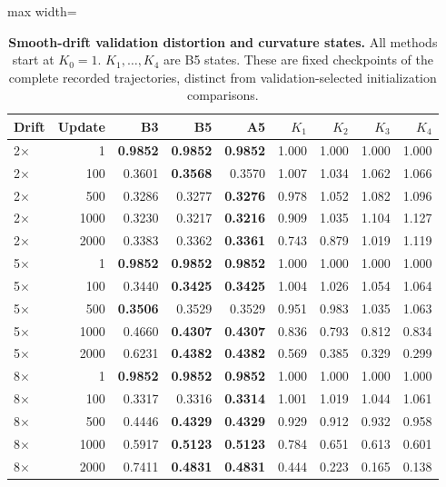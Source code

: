 \begin{table}[H]
\centering
\caption{\textbf{Smooth-drift validation distortion and curvature states.} All methods start at $K_0=1$. $K_1,\ldots,K_4$ are B5 states. These are fixed checkpoints of the complete recorded trajectories, distinct from validation-selected initialization comparisons.}
\label{tab:drift-states}
\footnotesize\setlength{\tabcolsep}{4.2pt}\renewcommand{\arraystretch}{1.12}
\begin{adjustbox}{max width=\linewidth}
\begin{tabular}{lrrrrrrrr}
\toprule
Drift & Update & B3 & B5 & A5 & $K_1$ & $K_2$ & $K_3$ & $K_4$ \\
\midrule
2$\times$ & 1 & \textbf{0.9852} & \cellcolor{oursbg}\textbf{0.9852} & \textbf{0.9852} & 1.000 & 1.000 & 1.000 & 1.000 \\
2$\times$ & 100 & 0.3601 & \cellcolor{oursbg}\textbf{0.3568} & 0.3570 & 1.007 & 1.034 & 1.062 & 1.066 \\
2$\times$ & 500 & 0.3286 & \cellcolor{oursbg}0.3277 & \textbf{0.3276} & 0.978 & 1.052 & 1.082 & 1.096 \\
2$\times$ & 1000 & 0.3230 & \cellcolor{oursbg}0.3217 & \textbf{0.3216} & 0.909 & 1.035 & 1.104 & 1.127 \\
2$\times$ & 2000 & 0.3383 & \cellcolor{oursbg}0.3362 & \textbf{0.3361} & 0.743 & 0.879 & 1.019 & 1.119 \\
5$\times$ & 1 & \textbf{0.9852} & \cellcolor{oursbg}\textbf{0.9852} & \textbf{0.9852} & 1.000 & 1.000 & 1.000 & 1.000 \\
5$\times$ & 100 & 0.3440 & \cellcolor{oursbg}\textbf{0.3425} & \textbf{0.3425} & 1.004 & 1.026 & 1.054 & 1.064 \\
5$\times$ & 500 & \textbf{0.3506} & \cellcolor{oursbg}0.3529 & 0.3529 & 0.951 & 0.983 & 1.035 & 1.063 \\
5$\times$ & 1000 & 0.4660 & \cellcolor{oursbg}\textbf{0.4307} & \textbf{0.4307} & 0.836 & 0.793 & 0.812 & 0.834 \\
5$\times$ & 2000 & 0.6231 & \cellcolor{oursbg}\textbf{0.4382} & \textbf{0.4382} & 0.569 & 0.385 & 0.329 & 0.299 \\
8$\times$ & 1 & \textbf{0.9852} & \cellcolor{oursbg}\textbf{0.9852} & \textbf{0.9852} & 1.000 & 1.000 & 1.000 & 1.000 \\
8$\times$ & 100 & 0.3317 & \cellcolor{oursbg}0.3316 & \textbf{0.3314} & 1.001 & 1.019 & 1.044 & 1.061 \\
8$\times$ & 500 & 0.4446 & \cellcolor{oursbg}\textbf{0.4329} & \textbf{0.4329} & 0.929 & 0.912 & 0.932 & 0.958 \\
8$\times$ & 1000 & 0.5917 & \cellcolor{oursbg}\textbf{0.5123} & \textbf{0.5123} & 0.784 & 0.651 & 0.613 & 0.601 \\
8$\times$ & 2000 & 0.7411 & \cellcolor{oursbg}\textbf{0.4831} & \textbf{0.4831} & 0.444 & 0.223 & 0.165 & 0.138 \\
\bottomrule
\end{tabular}
\end{adjustbox}
\end{table}
